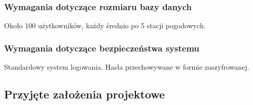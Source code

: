 \documentclass{article}
\begin{document}
    \subsubsection{Wymagania dotyczące rozmiaru bazy danych}
    Około 100 użytkowników, każdy średnio po 5 stacji pogodowych.
\subsubsection{Wymagania dotyczące bezpieczeństwa systemu}
    Standardowy system logowania. Hasła przechowywane w formie zaszyfrowanej.
\subsection{Przyjęte założenia projektowe}



% 
% 
\end{document}
